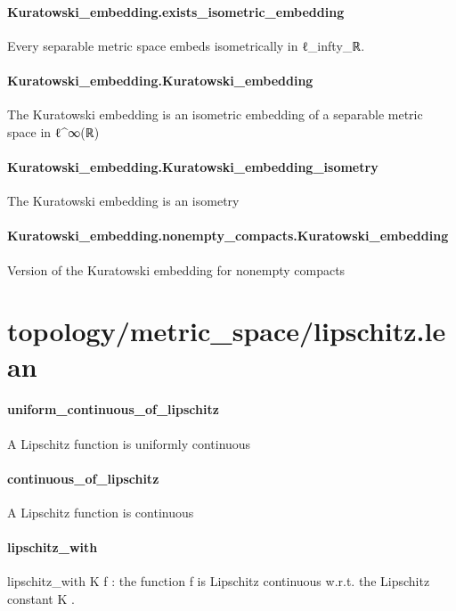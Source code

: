 \documentclass{article}
\begin{document}
\paragraph{Kuratowski\_embedding.exists\_isometric\_embedding}
\par
Every separable metric space embeds isometrically in ℓ\_infty\_ℝ.
\paragraph{Kuratowski\_embedding.Kuratowski\_embedding}
\par
The Kuratowski embedding is an isometric embedding of a separable metric space in ℓ\textasciicircum{}∞(ℝ)
\paragraph{Kuratowski\_embedding.Kuratowski\_embedding\_isometry}
\par
The Kuratowski embedding is an isometry
\paragraph{Kuratowski\_embedding.nonempty\_compacts.Kuratowski\_embedding}
\par
Version of the Kuratowski embedding for nonempty compacts
\section{topology/metric\_space/lipschitz.lean}\paragraph{uniform\_continuous\_of\_lipschitz}
\par
A Lipschitz function is uniformly continuous
\paragraph{continuous\_of\_lipschitz}
\par
A Lipschitz function is continuous
\paragraph{lipschitz\_with}
\par
\colorbox[RGB]{253,246,227}{{{{\color[RGB]{101, 123, 131} lipschitz\_with K f }}}}: the function 
\colorbox[RGB]{253,246,227}{{{{\color[RGB]{101, 123, 131} f }}}} is Lipschitz continuous w.r.t. the Lipschitz
constant 
\colorbox[RGB]{253,246,227}{{{{\color[RGB]{101, 123, 131} K }}}}.
\end{document}
